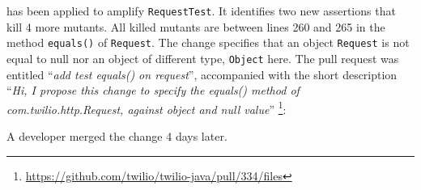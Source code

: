 \dspot has been applied to amplify \texttt{RequestTest}. 
It identifies two new assertions that kill 4 more mutants. 
All killed mutants are between lines 260 and 265 in the method \texttt{equals()} of \texttt{Request}. 
The change specifies that an object \texttt{Request} is not equal to null nor an object of different type, \ie \texttt{Object} here. 
The pull request was entitled ``\emph{add test equals() on request}'', accompanied with the short description ``\emph{Hi, I propose this change to specify the equals() method of com.twilio.http.Request, against object and null value}'' \footnote{\url{https://github.com/twilio/twilio-java/pull/334/files}}:
\begin{figure}[H]
	\centering{}
\end{figure}

A developer merged the change 4 days later.

